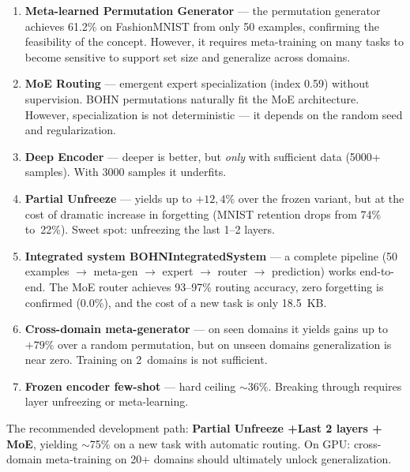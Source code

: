 \documentclass[11pt,a4paper]{report}
\begin{document}
\begin{enumerate}
    \item \textbf{Meta-learned Permutation Generator} --- the permutation generator achieves
          61.2\% on FashionMNIST from only 50 examples, confirming the feasibility
          of the concept. However, it requires meta-training on many tasks to become
          sensitive to support set size and generalize across domains.
    \item \textbf{MoE Routing} --- emergent expert specialization (index 0.59)
          without supervision. BOHN permutations naturally fit the MoE architecture.
          However, specialization is not deterministic --- it depends on the random seed and regularization.
    \item \textbf{Deep Encoder} --- deeper is better, but \emph{only} with
          sufficient data (5000+ samples). With 3000 samples it underfits.
    \item \textbf{Partial Unfreeze} --- yields up to $+12{,}4\%$ over the frozen variant,
          but at the cost of dramatic increase in forgetting (MNIST retention drops from 74\% to~22\%).
          Sweet spot: unfreezing the last 1--2 layers.
    \item \textbf{Integrated system BOHNIntegratedSystem} --- a complete pipeline
          (50 examples $\to$ meta-gen $\to$ expert $\to$ router $\to$ prediction) works
          end-to-end. The MoE router achieves 93--97\% routing accuracy, zero forgetting
          is confirmed (0.0\%), and the cost of a new task is only 18.5~KB.
    \item \textbf{Cross-domain meta-generator} --- on seen domains it yields gains
          up to $+79\%$ over a random permutation, but on unseen domains
          generalization is near zero. Training on 2~domains is not sufficient.
    \item \textbf{Frozen encoder few-shot} --- hard ceiling $\sim$36\%. Breaking through
          requires layer unfreezing or meta-learning.
\end{enumerate}

The recommended development path: \textbf{Partial Unfreeze +Last 2 layers + MoE},
yielding $\sim$75\% on a new task with automatic routing.
On GPU: cross-domain meta-training on 20+ domains should ultimately unlock generalization.



\end{document}
